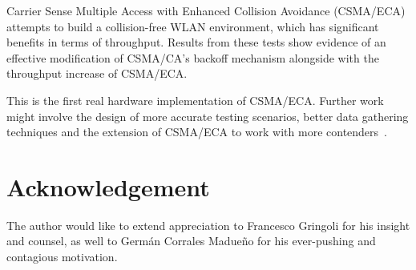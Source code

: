 \documentclass[conference]{IEEEtran}
\begin{document}
Carrier Sense Multiple Access with Enhanced Collision Avoidance (CSMA/ECA) attempts to build a collision-free WLAN environment, which has significant benefits in terms of throughput. Results from these tests show evidence of an effective modification of CSMA/CA's backoff mechanism alongside with the throughput increase of CSMA/ECA.

This is the first real hardware implementation of CSMA/ECA. Further work might involve the design of more accurate testing scenarios, better data gathering techniques and the extension of CSMA/ECA to work with more contenders~\cite{research2standards}.

\section{Acknowledgement}
The author would like to extend appreciation to Francesco Gringoli for his insight and counsel, as well to Germán Corrales Madueño for his ever-pushing and contagious motivation.



\end{document}

